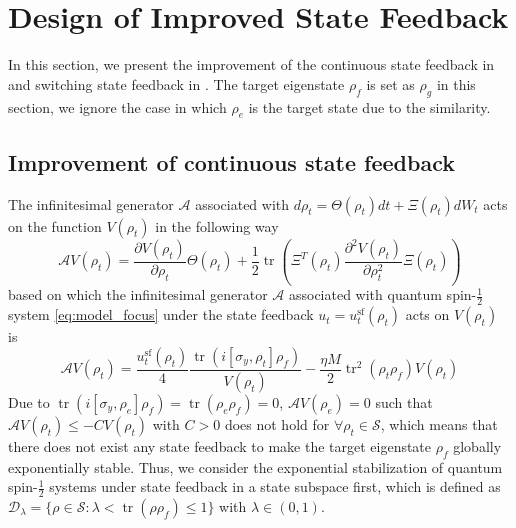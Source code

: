 \documentclass[]{elsarticle}
\begin{document}
\section{Design of Improved State Feedback}\label{Sec:ControlDesign}
In this section, we present the improvement of the continuous state feedback in \cite{LAMC2018} and switching state feedback in \cite{WSJZJ2021b}. The target eigenstate $\rho_f$ is set as $\rho_g$ in this section, we ignore the case in which $\rho_{e}$ is the target state due to the similarity.

\subsection{Improvement of continuous state feedback}
The infinitesimal generator $\mathcal{A}$ associated with $d\rho_{t}=\Theta(\rho_{t})dt+\Xi(\rho_{t})dW_t$ acts on the function $V\left(\rho_{t}\right)$ in the following way \cite{GVHJ2012}
\begin{equation}\label{eq:lv_ass}
	\mathcal{A} V(\rho_t)=\frac{\partial V(\rho_t)}{\partial \rho_t} \Theta\left(\rho_t\right)+\frac{1}{2}\operatorname{tr}\left(\Xi^T\left(\rho_t\right)\frac{\partial^{2} V\left(\rho_t\right)}{\partial \rho_t^{2}}\Xi\left(\rho_t\right)\right)
\end{equation}
based on which the infinitesimal generator $\mathcal{A}$ associated with quantum spin-$\frac{1}{2}$ system \eqref{eq:model_focus} under the state feedback $u_t=u^{\mathrm{sf}}_t\left(\rho_{t}\right)$ acts on $V(\rho_{t})$ is 
$$\mathcal{A} V\left(\rho_{t}\right)=\frac{u^{\mathrm{sf}}_t\left(\rho_{t}\right)}{4} \frac{\operatorname{tr}\left(i\left[\sigma_{y}, \rho_{t}\right] {\rho_f}\right)}{V\left(\rho_{t}\right)}
-\frac{\eta M}{2}\operatorname{tr}^2\left(\rho_{t} {\rho_f}\right) V\left(\rho_{t}\right)$$
Due to $\operatorname{tr}\left(i\left[\sigma_{y}, \rho_{e}\right] {\rho_f}\right)=\operatorname{tr}\left(\rho_{e} {\rho_f}\right)=0$, $\mathcal{A} V\left(\rho_{e}\right)=0$ such that $\mathcal{A} V\left(\rho_{t}\right)\le-CV\left(\rho_{t}\right)$ with $C>0$ does not hold for $\forall \rho_{t}\in \mathcal{S}$, which means that  there does not exist any state feedback to make the target eigenstate $\rho_{f}$ globally exponentially stable. Thus, we consider the exponential stabilization of quantum spin-$\frac{1}{2}$ systems under state feedback in a state subspace first, which is defined as $\mathcal{D}_\lambda=\{\rho\in\mathcal{S}:\lambda<\operatorname{tr}\left(\rho{\rho_f}\right)\le1\}$ with $\lambda \in(0,1)$.
\end{document}

